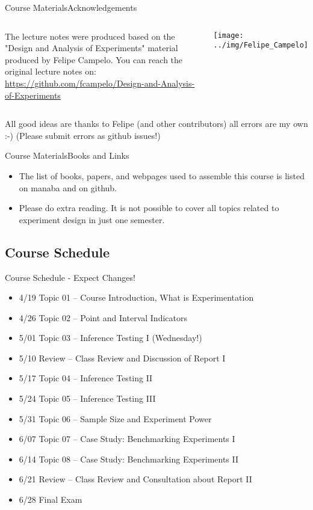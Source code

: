 \documentclass[aspectratio=169]{beamer}
\begin{document}
\begin{frame}{Course Materials}{Acknowledgements}
  \begin{columns}
    The lecture notes were produced based on the "Design and Analysis of Experiments" material produced by Felipe Campelo. You can reach the original lecture notes on: \url{https://github.com/fcampelo/Design-and-Analysis-of-Experiments}

    \hfill\texttt{[image: ../img/Felipe\_Campelo]}
  \end{columns}
  \bigskip

  All good ideas are thanks to Felipe (and other contributors) all errors are my own :-) (Please submit errors as github issues!)
\end{frame}

\begin{frame}[t]{Course Materials}{Books and Links}
  \begin{itemize}
  \item The list of books, papers, and webpages used to assemble this course
    is listed on manaba and on github.
  \item Please do extra reading. It is not possible to cover all
    topics related to experiment design in just one semester.
  \end{itemize}
\end{frame}



\subsection{Course Schedule}
\begin{frame}{Course Schedule - Expect Changes!}{}
  \begin{itemize}
    \item 4/19 Topic 01 -- Course Introduction, What is Experimentation
    \item 4/26 Topic 02 -- Point and Interval Indicators
    \item \alert{5/01 Topic 03 -- Inference Testing I (Wednesday!)}
    \item 5/10 Review -- Class Review and Discussion of Report I
    \item 5/17 Topic 04 -- Inference Testing II
    \item 5/24 Topic 05 -- Inference Testing III
    \item 5/31 Topic 06 -- Sample Size and Experiment Power
    \item 6/07 Topic 07 -- Case Study: Benchmarking Experiments I
    \item 6/14 Topic 08 -- Case Study: Benchmarking Experiments II
    \item 6/21 Review -- Class Review and Consultation about Report II
    \item 6/28 Final Exam
\end{itemize}
\end{frame}
\end{document}
